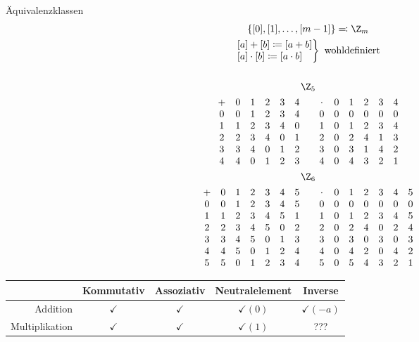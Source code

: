 Äquivalenzklassen
\begin{gather*}
	\{ [0] , [1] , \dotsc , [m-1] \} \eqqcolon \Z_m \\
	\left. \begin{matrix*}[l]
		[a] + [b] \coloneqq [a+b] \\
		[a] \cdot [b] \coloneqq [a \cdot b]
	\end{matrix*} \right\} \text{ wohldefiniert}\\
	\\
	\Z_5 \\
	\begin{matrix}
		+	&0	&1	&2	&3	&4	\\
		0	&0	&1	&2	&3	&4	\\
		1	&1	&2	&3	&4	&0	\\
		2	&2	&3	&4	&0	&1	\\
		3	&3	&4	&0	&1	&2	\\
		4	&4	&0	&1	&2	&3	
	\end{matrix} \qquad
	\begin{matrix}
		\cdot	&0	&1	&2	&3	&4	\\
		0	&0	&0	&0	&0	&0	\\
		1	&0	&1	&2	&3	&4	\\
		2	&0	&2	&4	&1	&3	\\
		3	&0	&3	&1	&4	&2	\\
		4	&0	&4	&3	&2	&1	
	\end{matrix}\\
	\Z_6 \\
	\begin{matrix}
		+	&0	&1	&2	&3	&4	&5	\\
		0	&0	&1	&2	&3	&4	&5	\\
		1	&1	&2	&3	&4	&5	&1	\\
		2	&2	&3	&4	&5	&0	&2	\\
		3	&3	&4	&5	&0	&1	&3	\\
		4	&4	&5	&0	&1	&2	&4	\\
		5	&5	&0	&1	&2	&3	&4	\\
	\end{matrix} \qquad
	\begin{matrix}
		\cdot	&0	&1	&2	&3	&4	&5	\\
		0	&0	&0	&0	&0	&0	&0	\\
		1	&0	&1	&2	&3	&4	&5	\\
		2	&0	&2	&4	&0	&2	&4	\\
		3	&0	&3	&0	&3	&0	&3	\\
		4	&0	&4	&2	&0	&4	&2	\\
		5	&0	&5	&4	&3	&2	&1	\\
	\end{matrix} \\
\end{gather*}
\begin{tabular}{ r | c | c | c | c }
				&Kommutativ	&Assoziativ	&Neutralelement		&Inverse			\\ \hline
	Addition		&$\checkmark$	&$\checkmark$	&$\checkmark (0)$	&$\checkmark (-a)$	\\
	Multiplikation	&$\checkmark$	&$\checkmark$	&$\checkmark (1)$	&???				
\end{tabular}

